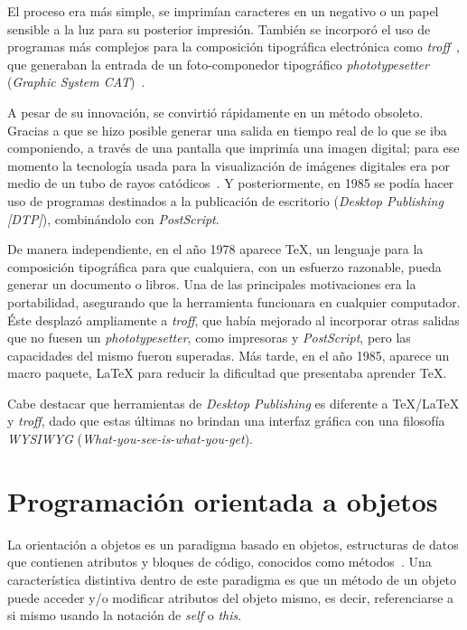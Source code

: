 \documentclass[12pt,letterpaper,titlepage,oneside,openright]{book}
\newcommand{\latex}{\LaTeX\xspace}
\newcommand{\tex}{\TeX\xspace}
\begin{document}
El proceso era más simple, se imprimían caracteres en un negativo o un papel sensible a la luz para su posterior impresión. También se incorporó el uso de programas más complejos para la composición tipográfica electrónica como \textit{troff}~\cite{webtroffhp}, que generaban la entrada de un foto-componedor tipográfico \textit{phototypesetter} (\textit{Graphic System CAT})~\cite{thompson1980exp}.

A pesar de su innovación, se convirtió rápidamente en un método obsoleto. Gracias a que se hizo posible generar una salida en tiempo real de lo que se iba componiendo, a través de una pantalla que imprimía una imagen digital; para ese momento la tecnología usada para la visualización de imágenes digitales era por medio de un tubo de rayos catódicos~\cite{zadeh1977encyclopedia}. Y posteriormente, en 1985 se podía hacer uso de programas destinados a la publicación de escritorio (\textit{Desktop Publishing [DTP]}), combinándolo con \textit{{PostScript}}.

De manera independiente, en el año 1978 aparece \tex, un lenguaje para la composición tipográfica para que cualquiera, con un esfuerzo razonable, pueda generar un documento o libros. Una de las principales motivaciones era la portabilidad, asegurando que la herramienta funcionara en cualquier computador. Éste desplazó ampliamente a \textit{troff}, que había mejorado al incorporar otras salidas que no fuesen un \textit{phototypesetter}, como impresoras y \textit{PostScript}, pero las capacidades del mismo fueron superadas. Más tarde, en el año 1985, aparece un macro paquete, \latex para reducir la dificultad que presentaba aprender \tex.

Cabe destacar que herramientas de \textit{Desktop Publishing} es diferente a \tex/\latex y \textit{troff}, dado que estas últimas no brindan una interfaz gráfica con una filosofía \textit{WYSIWYG} (\textit{What-you-see-is-what-you-get}).

\section{Programación orientada a objetos}

La orientación a objetos es un paradigma basado en objetos, estructuras de datos que contienen atributos y bloques de código, conocidos como métodos~\cite{bruce2002foundations}. Una característica distintiva dentro de este paradigma es que un método de un objeto puede acceder y/o modificar atributos del objeto mismo, es decir, referenciarse a si mismo usando la notación de \textit{self} o \textit{this}.
\end{document}
